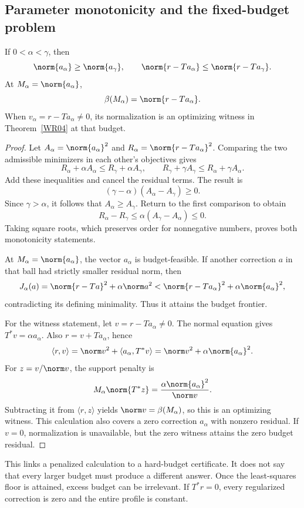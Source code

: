 \subsection{Parameter monotonicity and the fixed-budget problem}
\begin{proposition}\label{WR07}
If $0<\alpha<\gamma$, then
\[
 \norm{a_\alpha}\ge\norm{a_\gamma},\qquad
 \norm{r-Ta_\alpha}\le\norm{r-Ta_\gamma}.
\]
At $M_\alpha=\norm{a_\alpha}$,
\[
 \beta(M_\alpha)=\norm{r-Ta_\alpha}.
\]
When $v_\alpha=r-Ta_\alpha\ne0$, its normalization is an optimizing witness in Theorem~\ref{WR04} at that budget.
\end{proposition}
\begin{proof}
Let $A_\alpha=\norm{a_\alpha}^2$ and $R_\alpha=\norm{r-Ta_\alpha}^2$. Comparing the two admissible minimizers in each other's objectives gives
\[
 R_\alpha+\alpha A_\alpha\le R_\gamma+\alpha A_\gamma,
 \qquad R_\gamma+\gamma A_\gamma\le R_\alpha+\gamma A_\alpha.
\]
Add these inequalities and cancel the residual terms. The result is
\[
 (\gamma-\alpha)(A_\alpha-A_\gamma)\ge0.
\]
Since $\gamma>\alpha$, it follows that $A_\alpha\ge A_\gamma$. Return to the first comparison to obtain
\[
 R_\alpha-R_\gamma\le\alpha(A_\gamma-A_\alpha)\le0.
\]
Taking square roots, which preserves order for nonnegative numbers, proves both monotonicity statements.

At $M_\alpha=\norm{a_\alpha}$, the vector $a_\alpha$ is budget-feasible. If another correction $a$ in that ball had strictly smaller residual norm, then
\[
 J_\alpha(a)
 =\norm{r-Ta}^2+\alpha\norm a^2
 <\norm{r-Ta_\alpha}^2+\alpha\norm{a_\alpha}^2,
\]
contradicting its defining minimality. Thus it attains the budget frontier.

For the witness statement, let $v=r-Ta_\alpha\ne0$. The normal equation gives $T^*v=\alpha a_\alpha$. Also $r=v+Ta_\alpha$, hence
\[
 \langle r,v\rangle
 =\norm v^2+\langle a_\alpha,T^*v\rangle
 =\norm v^2+\alpha\norm{a_\alpha}^2.
\]
For $z=v/\norm v$, the support penalty is
\[
 M_\alpha\norm{T^*z}
 =\frac{\alpha\norm{a_\alpha}^2}{\norm v}.
\]
Subtracting it from $\langle r,z\rangle$ yields $\norm v=\beta(M_\alpha)$, so this is an optimizing witness. This calculation also covers a zero correction $a_\alpha$ with nonzero residual. If $v=0$, normalization is unavailable, but the zero witness attains the zero budget residual.
\end{proof}

This links a penalized calculation to a hard-budget certificate. It does not say that every larger budget must produce a different answer. Once the least-squares floor is attained, excess budget can be irrelevant. If $T^*r=0$, every regularized correction is zero and the entire profile is constant.


